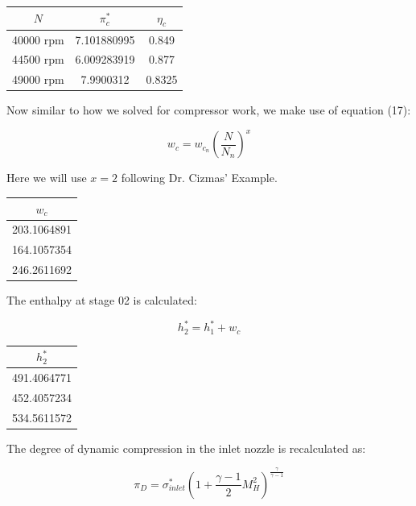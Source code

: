 \documentclass[titlepage]{article}
\begin{document}
\begin{center}
  \begin{tabular}{|c|c|c|}
    \hline
    $N$ & $\pi_{c}^{*}$ & $\eta_{c}$ \\
    \hline
    40000 rpm & 7.101880995 & 0.849 \\
    \hline
    44500 rpm & 6.009283919 & 0.877 \\
    \hline
    49000 rpm & 7.9900312 & 0.8325 \\
    \hline
  \end{tabular}
\end{center}

Now similar to how we solved for compressor work, we make use of equation (17):

\begin{center}
  $$w_{c} = w_{c_{n}} \left( \frac{N}{N_{n}}\right)^{x}$$
\end{center}

Here we will use $x = 2$ following Dr. Cizmas' Example.

\begin{center}
  \begin{tabular}{|c|}
    \hline
    $w_{c}$ \\
    \hline
    203.1064891\\
    \hline
    164.1057354 \\
    \hline
    246.2611692 \\
    \hline
  \end{tabular}
\end{center}

The enthalpy at stage 02 is calculated:

\begin{equation}
  h_{2}^{*} = h_{1}^{*} + w_{c}
\end{equation}

\begin{center}
  \begin{tabular}{|c|}
    \hline
    $h_{2}^{*}$ \\
    \hline
    491.4064771 \\
    \hline
    452.4057234 \\
    \hline
    534.5611572 \\
    \hline
  \end{tabular}
\end{center}

The degree of dynamic compression in the inlet nozzle is recalculated as:

\begin{equation}
  \pi_{D} = \sigma_{inlet}^{*} \left( 1+\frac{\gamma - 1}{2}M_{H}^{2}\right)^{\frac{\gamma}{\gamma - 1}}
\end{equation}
\end{document}
